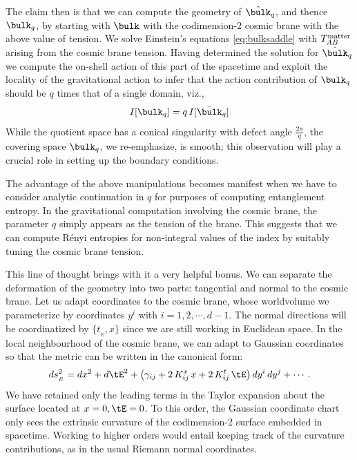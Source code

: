 \documentclass[12pt,openany]{book}
\begin{document}
The claim then is that we can compute the geometry of ${\hat \bulk}_q$, and thence $\bulk_q$, by starting with
$\bulk$ with the codimension-2 cosmic brane with the above value of tension. We solve Einstein's equations
\eqref{eq:bulksaddle} with $T^{\tiny{\text{matter}}}_{AB}$ arising from the cosmic brane tension. Having determined the solution for ${\hat \bulk}_q$ we compute the on-shell action of this part of the spacetime and exploit the locality of the gravitational action to infer that the action contribution of $\bulk_q$ should be $q$ times that of a single domain, viz.,
%
\begin{align}
I[\bulk_q] = q\, I[{\hat \bulk}_q]
\label{eq:lmI1}
\end{align}
%
While the quotient space has a conical singularity with defect angle $\frac{2\pi}{q}$, the covering space $\bulk_q$, we re-emphasize, is smooth; this observation will play a crucial  role in setting up the boundary conditions.

The advantage of the above manipulations becomes manifest when we have to consider analytic continuation in $q$ for purposes of computing entanglement entropy. In the gravitational computation involving the cosmic brane, the parameter $q$ simply appears as the tension of the brane. This suggests that we can compute R\'enyi entropies for non-integral values of the index by suitably tuning the cosmic brane tension.

This line of thought brings with it a very helpful bonus. We can separate the deformation of the geometry into two parts: tangential and normal to the cosmic brane. Let us adapt coordinates to the cosmic brane, whose worldvolume we parameterize by coordinates $y^i$ with $i=1,2,\cdots, d-1$. The normal directions will be coordinatized by $\{t_{_E} ,x \}$ since we are  still working in Euclidean space. In the local neighbourhood of the cosmic brane, we can adapt to Gaussian coordinates so that the metric can be written in the canonical form:
%
\begin{equation}
ds_{_ E}^2=dx^2+d\tE^2+\left(\gamma_{i j}+2\, K_{ i j}^x\, x+2\, K_{ i j}^t\, \tE \right)dy^i\, dy^j+ \cdots \,.
\label{eq:lm0}
\end{equation}
%
We have retained only the leading terms in the Taylor expansion about the surface located at $x=0, \tE=0$.  To this order, the Gaussian coordinate chart only sees the extrinsic curvature of the codimension-2 surface embedded in spacetime. Working to higher orders  would entail keeping track of the curvature contributions, as in the usual Riemann normal coordinates.
\end{document}
